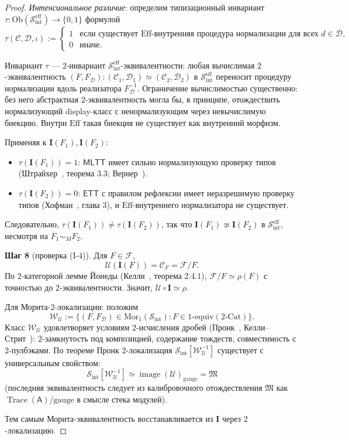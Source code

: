 \documentclass[11pt]{article}
\theoremstyle{plain}
\theoremstyle{definition}
\newcommand{\cS}{\mathcal{S}}
\newcommand{\cF}{\mathcal{F}}
\newcommand{\cC}{\mathcal{C}}
\newcommand{\cD}{\mathcal{D}}
\newcommand{\fM}{\mathfrak{M}}
\newcommand{\Sint}{\cS_{\mathrm{int}}}
\newcommand{\Ob}{\mathrm{Ob}}
\newcommand{\Mor}{\mathrm{Mor}}
\newcommand{\Cat}{\mathrm{Cat}}
\newcommand{\MLTT}{\mathsf{MLTT}}
\newcommand{\ETT}{\mathsf{ETT}}
\newcommand{\II}{\mathbf{I}}
\newcommand{\cU}{\mathcal{U}}
\DeclareMathOperator{\image}{image}
\DeclareMathOperator{\Trace}{Trace}
\begin{document}
\begin{proof}
\emph{Интенсиональное различие}: определим типизационный инвариант $\tau : \Ob(\Sint^{\mathrm{eff}}) \to \{0, 1\}$ формулой
\[ \tau(\cC, \cD, \iota) := \begin{cases} 1 & \text{если существует $\mathrm{Eff}$-внутренняя процедура нормализации для всех } d \in \cD, \\ 0 & \text{иначе.} \end{cases} \]

Инвариант $\tau$ — $2$-инвариант $\Sint^{\mathrm{eff}}$-эквивалентности: любая вычислимая $2$-эквивалентность $(F, F_\cD) : (\cC_1, \cD_1) \simeq (\cC_2, \cD_2)$ в $\Sint^{\mathrm{eff}}$ переносит процедуру нормализации вдоль реализатора $F_\cD^{-1}$. Ограничение вычислимостью существенно: без него абстрактная $2$-эквивалентность могла бы, в принципе, отождествить нормализующий display-класс с ненормализующим через невычислимую биекцию. Внутри $\mathrm{Eff}$ такая биекция не существует как внутренний морфизм.

Применяя к $\II(F_1), \II(F_2)$:
\begin{itemize}
\item $\tau(\II(F_1)) = 1$: $\MLTT$ имеет сильно нормализующую проверку типов (Штрайхер~\cite{Streicher1991}, теорема 3.3; Вернер~\cite{Werner1994}).
\item $\tau(\II(F_2)) = 0$: $\ETT$ с правилом рефлексии имеет неразрешимую проверку типов (Хофман~\cite{Hofmann1995}, глава 3), и $\mathrm{Eff}$-внутреннего нормализатора не существует.
\end{itemize}

Следовательно, $\tau(\II(F_1)) \neq \tau(\II(F_2))$, так что $\II(F_1) \not\simeq \II(F_2)$ в $\Sint^{\mathrm{eff}}$, несмотря на $F_1 \sim_M F_2$.

\textbf{Шаг 8} (проверка (I-4)). Для $F \in \cF$,
\[ \cU(\II(F)) = \cC_F = \cF / F. \]
По $2$-категорной лемме Йонеды (Келли~\cite{Kelly1982}, теорема 2.4.1), $\cF / F \simeq \rho(F)$ с точностью до $2$-эквивалентности. Значит, $\cU \circ \II \simeq \rho$.

Для Морита-$2$-локализации: положим
\[ \mathcal{W}_\cU := \{(F, F_\cD) \in \Mor_1(\Sint) : F \in 1\text{-equiv}(2\text{-}\Cat)\}. \]
Класс $\mathcal{W}_\cU$ удовлетворяет условиям $2$-исчисления дробей (Пронк~\cite{Pronk1996}, Келли--Стрит~\cite{KellyStreet1974}): $2$-замкнутость под композицией, содержание тождеств, совместимость с $2$-пулбэками. По теореме Пронк $2$-локализация $\Sint[\mathcal{W}_\cU^{-1}]$ существует с универсальным свойством:
\[ \Sint[\mathcal{W}_\cU^{-1}] \simeq \image(\cU)_{\mathrm{gauge}} = \fM \]
(последняя эквивалентность следует из калибровочного отождествления $\fM$ как $\Trace(\mathsf{A})/\mathrm{gauge}$ в смысле стека модулей).

Тем самым Морита-эквивалентность восстанавливается из $\II$ через $2$-локализацию.
\end{proof}
\end{document}
